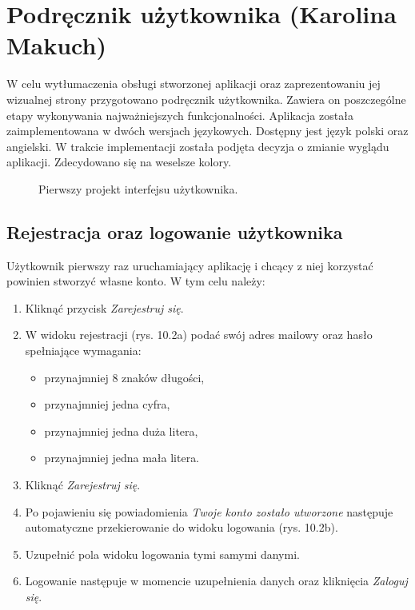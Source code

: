 \chapter{Podręcznik użytkownika (Karolina Makuch)}
\par W celu wytłumaczenia obsługi stworzonej aplikacji oraz zaprezentowaniu jej wizualnej strony przygotowano podręcznik użytkownika. Zawiera on poszczególne etapy wykonywania najważniejszych funkcjonalności.
Aplikacja została zaimplementowana w dwóch wersjach językowych. Dostępny jest język polski oraz angielski.
W trakcie implementacji została podjęta decyzja o zmianie wyglądu aplikacji. Zdecydowano się na weselsze kolory.

\begin{figure}[h]

\centering
\null\hfill
{}
\hfill
{}
\hfill
{}
\hfill\null

\caption{Pierwszy projekt interfejsu użytkownika.}
\label{fig:podrecznik10}
\end{figure}
\FloatBarrier

\section{Rejestracja oraz logowanie użytkownika}
Użytkownik pierwszy raz uruchamiający aplikację i chcący z niej korzystać powinien stworzyć własne konto. W tym celu należy:

\begin{enumerate}
\item Kliknąć przycisk \textit{Zarejestruj się}.
\item W widoku rejestracji (rys. 10.2a) podać swój adres mailowy oraz hasło spełniające wymagania:
\begin{itemize}
\item przynajmniej 8 znaków długości,
\item przynajmniej jedna cyfra,
\item przynajmniej jedna duża litera,
\item przynajmniej jedna mała litera.
\end{itemize}

\item Kliknąć \textit{Zarejestruj się}.
\item Po pojawieniu się powiadomienia \textit{Twoje konto zostało utworzone} następuje automatyczne przekierowanie do widoku logowania (rys. 10.2b).
\item Uzupełnić pola widoku logowania tymi samymi danymi.
\item Logowanie następuje w momencie uzupełnienia danych oraz kliknięcia \textit{Zaloguj się}.
\end{enumerate}

